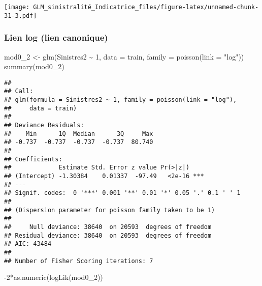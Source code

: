 \documentclass[
]{article}
\newenvironment{Shaded}{\begin{snugshade}}{\end{snugshade}}
\newcommand{\AttributeTok}[1]{\textcolor[rgb]{0.77,0.63,0.00}{#1}}
\newcommand{\DecValTok}[1]{\textcolor[rgb]{0.00,0.00,0.81}{#1}}
\newcommand{\FunctionTok}[1]{\textcolor[rgb]{0.00,0.00,0.00}{#1}}
\newcommand{\NormalTok}[1]{#1}
\newcommand{\OtherTok}[1]{\textcolor[rgb]{0.56,0.35,0.01}{#1}}
\newcommand{\SpecialCharTok}[1]{\textcolor[rgb]{0.00,0.00,0.00}{#1}}
\newcommand{\StringTok}[1]{\textcolor[rgb]{0.31,0.60,0.02}{#1}}
\begin{document}
\begin{Shaded}
\end{Shaded}

\texttt{[image: GLM\_sinistralité\_Indicatrice\_files/figure-latex/unnamed-chunk-31-3.pdf]}

\hypertarget{lien-log-lien-canonique}{%
\subsubsection{Lien log (lien
canonique)}\label{lien-log-lien-canonique}}

\begin{Shaded}
\begin{Highlighting}[]
\NormalTok{mod0\_2 }\OtherTok{\textless{}{-}} \FunctionTok{glm}\NormalTok{(Sinistres2 }\SpecialCharTok{\textasciitilde{}} \DecValTok{1}\NormalTok{, }\AttributeTok{data =}\NormalTok{ train, }\AttributeTok{family =} \FunctionTok{poisson}\NormalTok{(}\AttributeTok{link =} \StringTok{"log"}\NormalTok{))}
\FunctionTok{summary}\NormalTok{(mod0\_2)}
\end{Highlighting}
\end{Shaded}

\begin{verbatim}
## 
## Call:
## glm(formula = Sinistres2 ~ 1, family = poisson(link = "log"), 
##     data = train)
## 
## Deviance Residuals: 
##    Min      1Q  Median      3Q     Max  
## -0.737  -0.737  -0.737  -0.737  80.740  
## 
## Coefficients:
##             Estimate Std. Error z value Pr(>|z|)    
## (Intercept) -1.30384    0.01337  -97.49   <2e-16 ***
## ---
## Signif. codes:  0 '***' 0.001 '**' 0.01 '*' 0.05 '.' 0.1 ' ' 1
## 
## (Dispersion parameter for poisson family taken to be 1)
## 
##     Null deviance: 38640  on 20593  degrees of freedom
## Residual deviance: 38640  on 20593  degrees of freedom
## AIC: 43484
## 
## Number of Fisher Scoring iterations: 7
\end{verbatim}

\begin{Shaded}
\begin{Highlighting}[]
\SpecialCharTok{{-}}\DecValTok{2}\SpecialCharTok{*}\FunctionTok{as.numeric}\NormalTok{(}\FunctionTok{logLik}\NormalTok{(mod0\_2))}
\end{Highlighting}
\end{Shaded}
\end{document}
